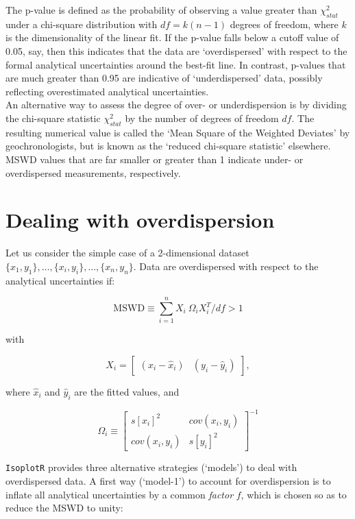 \documentclass{article}
\begin{document}
The p-value is defined as the probability of observing a value greater
than $\chi_{stat}^2$ under a chi-square distribution with $df =
k(n-1)$ degrees of freedom, where $k$ is the dimensionality of the
linear fit.  If the p-value falls below a cutoff value of 0.05, say,
then this indicates that the data are `overdispersed' with respect to
the formal analytical uncertainties around the best-fit line. In
contrast, p-values that are much greater than 0.95 are indicative of
`underdispersed' data, possibly reflecting overestimated analytical
uncertainties.\\

An alternative way to assess the degree of over- or underdispersion is
by dividing the chi-square statistic $\chi^2_{stat}$ by the number of
degrees of freedom $df$. The resulting numerical value is called the
`Mean Square of the Weighted Deviates' \citep[MSWD,][]{mcintyre1966}
by geochronologists, but is known as the `reduced chi-square
statistic' elsewhere. MSWD values that are far smaller or greater than
1 indicate under- or overdispersed measurements, respectively.

\section{Dealing with overdispersion}
\label{sec:overdispersion}

Let us consider the simple case of a 2-dimensional dataset
$\{x_1,y_1\},\ldots,\{x_i,y_i\},\ldots,\{x_n,y_n\}$.  Data are
overdispersed with respect to the analytical uncertainties if:

\[
\mathrm{MSWD} \equiv
\sum\limits_{i=1}^n X_i~\Omega_i X_i^T / df > 1
\]

\noindent with

\[
X_i = \left[
  \begin{array}{cc}
    (x_i - \hat{x}_i) &  (y_i - \hat{y}_i)
  \end{array}
  \right],
\]

\noindent where $\hat{x}_i$ and $\hat{y}_i$ are the fitted values, and

\[
\Omega_i \equiv
\left[
  \begin{array}{cc}
    s[x_i]^2 & cov(x_i,y_i) \\
    cov(x_i,y_i) & s[y_i]^2
  \end{array}
\right]^{-1}
\]

\texttt{IsoplotR} provides three alternative strategies (`models') to
deal with overdispersed data. A first way (`model-1') to account for
overdispersion is to inflate all analytical uncertainties by a common
\emph{factor} $f$, which is chosen so as to reduce the MSWD to unity:
\end{document}
